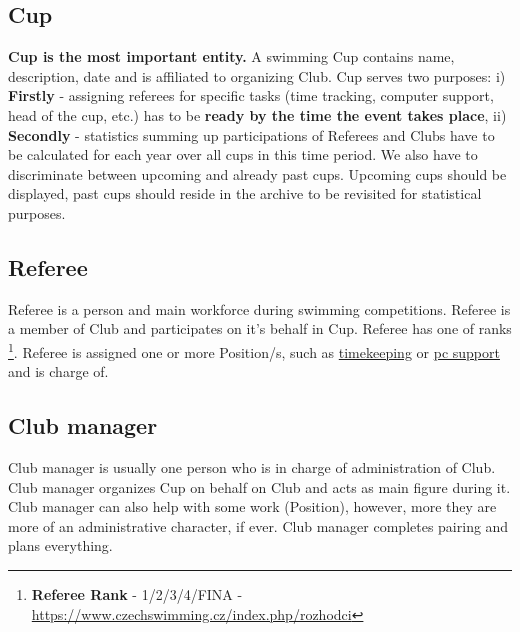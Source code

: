 \subsection*{Cup}
\textbf{Cup is the most important entity.} A swimming Cup contains name, description, date and is affiliated to organizing Club.
\newline 
Cup serves two purposes:
\newline 
i) \textbf{Firstly} - assigning referees for specific tasks (time tracking, computer support, head of the cup, etc.) has to be \textbf{ready by the time the event takes place},
\newline
ii) \textbf{Secondly} - statistics summing up participations of Referees and Clubs have to be calculated for each year over all cups in this time period. We also have to discriminate between upcoming and already past cups. Upcoming cups should be displayed, past cups should reside in the archive to be revisited for statistical purposes.

\subsection*{Referee}
Referee is a person and main workforce during swimming competitions. Referee is a member of Club and participates on it's behalf in Cup. Referee has one of ranks  \footnote{\textbf{Referee Rank} - 1/2/3/4/FINA - \url{https://www.czechswimming.cz/index.php/rozhodci}}. Referee is assigned one or more Position/s, such as \underline{timekeeping} or \underline{pc support} and is charge of. 
\subsection*{Club manager}
Club manager is usually one person who is in charge of administration of Club. Club manager organizes Cup on behalf on Club and acts as main figure during it. Club manager can also help with some work (Position), however, more they are more of an administrative character, if ever. Club manager completes pairing and plans everything. 
